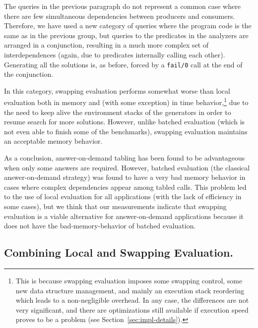 \documentclass{./tlp}
\renewcommand{\mnote}[1]{}
\newcommand{\redsect}{\vspace{-1em}}
\begin{document}
The queries in the previous paragraph do not represent a common case
where there are few simultaneous dependencies between producers and
consumers.
Therefore, we have used a new category of queries where the program
code is the same as in the previous group, but queries to the
predicates in the analyzers are arranged in a conjunction, resulting
in a much more complex set of interdependences (again, due to
predicates internally calling each other). Generating all the solutions is, as before, forced by a \lstinline{fail/0}
call at the end of the conjunction.







 





In this category, swapping evaluation performs somewhat worse than
local evaluation both in memory and (with some exception) in time
behavior,\footnote{This is because swapping evaluation imposes some
  swapping control, some new data structure management, and mainly an
  execution stack reordering which leads to a non-negligible
  overhead. In any case, the differences are not very significant, and
  there are optimizations still available if execution speed proves to
  be a problem (see Section~\ref{sec:impl-details}).}  \mnote{hum?
  recheck footnote} due to the need to keep alive the environment
stacks of the generators in order to resume search for more solutions.
However, unlike batched evaluation (which is not even able to finish
some of the benchmarks), swapping evaluation maintains an acceptable
memory behavior.






As a conclusion, answer-on-demand tabling has been found to be
advantageous when only some answers are required.  However, batched
evaluation (the classical answer-on-demand strategy) was found to have
a very bad memory behavior in cases where complex dependencies appear
among tabled calls. This problem led to the use of local evaluation
for all applications (with the lack of efficiency in some cases), but
we think that our measurements indicate that swapping evaluation is a
viable alternative for answer-on-demand applications because it does
not have the bad-memory-behavior of batched evaluation.



\redsect
\subsection{Combining Local and Swapping Evaluation.}
\label{sec:simulate-local} 
\end{document}

